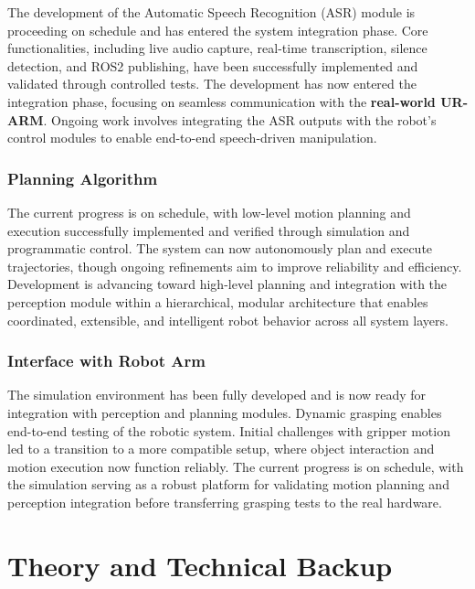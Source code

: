 \documentclass[12pt]{extarticle}
\begin{document}
The development of the Automatic Speech Recognition (ASR) module is proceeding on schedule and has entered the system integration phase. Core functionalities, including live audio capture, real-time transcription, silence detection, and ROS2 publishing, have been successfully implemented and validated through controlled tests. The development has now entered the integration phase, focusing on seamless communication with the \textbf{real-world UR-ARM}. Ongoing work involves integrating the ASR outputs with the robot's control modules to enable end-to-end speech-driven manipulation.

\subsubsection{Planning Algorithm}
The current progress is on schedule, with low-level motion planning and execution successfully implemented and verified through simulation and programmatic control. The system can now autonomously plan and execute trajectories, though ongoing refinements aim to improve reliability and efficiency. Development is advancing toward high-level planning and integration with the perception module within a hierarchical, modular architecture that enables coordinated, extensible, and intelligent robot behavior across all system layers.

\subsubsection{Interface with Robot Arm}
The simulation environment has been fully developed and is now ready for integration with perception and planning modules. Dynamic grasping enables end-to-end testing of the robotic system. Initial challenges with gripper motion led to a transition to a more compatible setup, where object interaction and motion execution now function reliably. The current progress is on schedule, with the simulation serving as a robust platform for validating motion planning and perception integration before transferring grasping tests to the real hardware.

\newpage
\section{Theory and Technical Backup}
\end{document}
